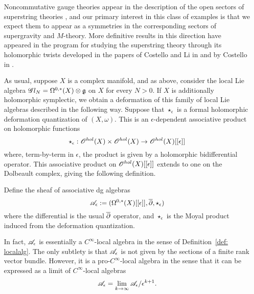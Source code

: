 Noncommutative gauge theories appear in the description of the open sectors of superstring theories \cite{WittenNonComm}, and our primary interest in this class of examples is that we expect them to appear as a symmetries in the corresponding sectors of supergravity and $M$-theory. 
More definitive results in this direction have appeared in the program for studying the superstring theory through its holomorphic twists developed in the papers of Costello and Li in \cite{CostelloLiSUGRA} and by Costello in \cite{MTheory1, MTheory2}. 

As usual, suppose $X$ is a complex manifold, and as above, consider the local Lie algebra $\mathscr G l_N = \Omega^{0,*}(X) \otimes \mathfrak g$ on $X$ for every $N > 0$. 
If $X$ is additionally holomorphic symplectic, we obtain a deformation of this family of local Lie algebras described in the following way. 
Suppose that $\star_\epsilon$ is a formal holomorphic deformation quantization of $(X,\omega)$. 
This is an $\epsilon$-dependent associative product on holomorphic functions 
\[
\star_\epsilon : \mathscr O^{hol}(X) \times \mathscr O^{hol}(X) \to \mathscr O^{hol}(X)[[\epsilon]]
\]
where, term-by-term in $\epsilon$, the product is given by a holomorphic bidifferential operator. 
This associative product on $\mathscr O^{hol}(X)[[\epsilon]]$ extends to one on the Dolbeault complex, giving the following definition. 

\begin{dfn}
Define the sheaf of associative dg algebras
\[
\mathscr A_\epsilon := (\Omega^{0,*}(X)[[\epsilon]], \overline{\partial}, \star_{\epsilon})
\]
where the differential is the usual $\overline{\partial}$ operator, and $\star_{\epsilon}$ is the Moyal product induced from the deformation quantization.
\end{dfn}

In fact, $\mathscr A_\epsilon$ is essentially a $C^\infty$-local algebra in the sense of Definition~\ref{def: localalg}. 
The only subtlety is that $\mathscr A_\epsilon$ is not given by the sections of a finite rank vector bundle.
However, it is a pro-$C^\infty$-local algebra in the sense that it can be expressed as a limit of $C^\infty$-local algebras
\[
\mathscr A_\epsilon = \lim_{k \to \infty} \mathscr A_\epsilon / \epsilon^{k+1} .
\] 

